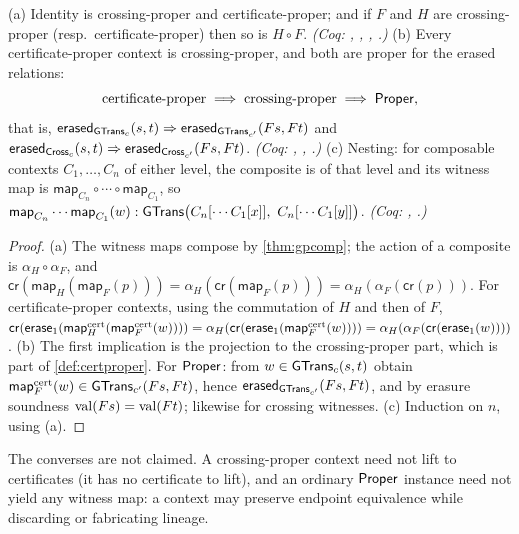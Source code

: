 \begin{thm}\label{thm:twolevels}
(a) Identity is crossing-proper and certificate-proper; and if $F$ and $H$ are crossing-proper (resp.\ certificate-proper) then so is $H \circ F$. \emph{(Coq: , , , .)}
(b) Every certificate-proper context is crossing-proper, and both are proper for the erased relations:
\[
\text{certificate-proper} \;\Longrightarrow\; \text{crossing-proper} \;\Longrightarrow\; \mathsf{Proper},
\]
that is, $\mathsf{erased}_{\mathsf{GTrans}_c}(s,t) \Rightarrow \mathsf{erased}_{\mathsf{GTrans}_{c'}}(Fs,Ft)$ and $\mathsf{erased}_{\mathsf{Cross}_c}(s,t) \Rightarrow \mathsf{erased}_{\mathsf{Cross}_{c'}}(Fs,Ft)$. \emph{(Coq: , , .)}
(c) Nesting: for composable contexts $C_1,\dots,C_n$ of either level, the composite is of that level and its witness map is $\mathsf{map}_{C_n}\circ\cdots\circ\mathsf{map}_{C_1}$, so
$\mathsf{map}_{C_n}\cdots\mathsf{map}_{C_1}(w) : \mathsf{GTrans}\bigl(C_n[\cdots C_1[x]],\ C_n[\cdots C_1[y]]\bigr)$. \emph{(Coq: , .)}
\end{thm}
\begin{proof}
(a) The witness maps compose by \cref{thm:gpcomp}; the action of a composite is $\alpha_H \circ \alpha_F$, and $\mathsf{cr}(\mathsf{map}_H(\mathsf{map}_F(p))) = \alpha_H(\mathsf{cr}(\mathsf{map}_F(p))) = \alpha_H(\alpha_F(\mathsf{cr}(p)))$. For certificate-proper contexts, using the commutation of $H$ and then of $F$,
$\mathsf{cr}(\mathsf{erase}_1(\mathsf{map}^{\mathrm{cert}}_H(\mathsf{map}^{\mathrm{cert}}_F(w)))) = \alpha_H(\mathsf{cr}(\mathsf{erase}_1(\mathsf{map}^{\mathrm{cert}}_F(w)))) = \alpha_H(\alpha_F(\mathsf{cr}(\mathsf{erase}_1(w))))$.
(b) The first implication is the projection to the crossing-proper part, which is part of \cref{def:certproper}. For $\mathsf{Proper}$: from $w \in \mathsf{GTrans}_c(s,t)$ obtain $\mathsf{map}^{\mathrm{cert}}_F(w) \in \mathsf{GTrans}_{c'}(Fs,Ft)$, hence $\mathsf{erased}_{\mathsf{GTrans}_{c'}}(Fs,Ft)$, and by erasure soundness $\mathrm{val}(Fs) = \mathrm{val}(Ft)$; likewise for crossing witnesses. (c) Induction on $n$, using (a).
\end{proof}
The converses are not claimed. A crossing-proper context need not lift to certificates (it has no certificate to lift), and an ordinary $\mathsf{Proper}$ instance need not yield any witness map: a context may preserve endpoint equivalence while discarding or fabricating lineage.

